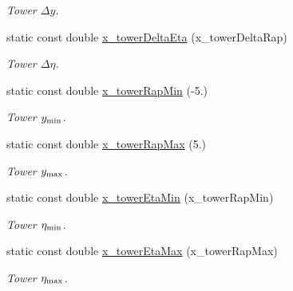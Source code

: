 \begin{CompactItemize}
\begin{CompactList}\small\item\em Tower $\Delta y$. \item\end{CompactList}\item 
\hypertarget{namespaceHistGroupCfg_8cc52200d6669bc50fba32ff5403e3a3}{
static const double \hyperlink{namespaceHistGroupCfg_8cc52200d6669bc50fba32ff5403e3a3}{x\_\-tower\-Delta\-Eta} (x\_\-tower\-Delta\-Rap)}
\label{namespaceHistGroupCfg_8cc52200d6669bc50fba32ff5403e3a3}

\begin{CompactList}\small\item\em Tower $\Delta\eta$. \item\end{CompactList}\item 
\hypertarget{namespaceHistGroupCfg_6cd7abc1eddfd00ceca363394f0793c9}{
static const double \hyperlink{namespaceHistGroupCfg_6cd7abc1eddfd00ceca363394f0793c9}{x\_\-tower\-Rap\-Min} (-5.)}
\label{namespaceHistGroupCfg_6cd7abc1eddfd00ceca363394f0793c9}

\begin{CompactList}\small\item\em Tower $y_{\rm min}$. \item\end{CompactList}\item 
\hypertarget{namespaceHistGroupCfg_dae79e39c9153aa7b5ba9947ff6beb04}{
static const double \hyperlink{namespaceHistGroupCfg_dae79e39c9153aa7b5ba9947ff6beb04}{x\_\-tower\-Rap\-Max} (5.)}
\label{namespaceHistGroupCfg_dae79e39c9153aa7b5ba9947ff6beb04}

\begin{CompactList}\small\item\em Tower $y_{\rm max}$. \item\end{CompactList}\item 
\hypertarget{namespaceHistGroupCfg_29bd5b6734a3c3cb04fd12950562e7a7}{
static const double \hyperlink{namespaceHistGroupCfg_29bd5b6734a3c3cb04fd12950562e7a7}{x\_\-tower\-Eta\-Min} (x\_\-tower\-Rap\-Min)}
\label{namespaceHistGroupCfg_29bd5b6734a3c3cb04fd12950562e7a7}

\begin{CompactList}\small\item\em Tower $\eta_{\rm min}$. \item\end{CompactList}\item 
\hypertarget{namespaceHistGroupCfg_2e7833efae3f89bfd8008c04ae685804}{
static const double \hyperlink{namespaceHistGroupCfg_2e7833efae3f89bfd8008c04ae685804}{x\_\-tower\-Eta\-Max} (x\_\-tower\-Rap\-Max)}
\label{namespaceHistGroupCfg_2e7833efae3f89bfd8008c04ae685804}

\begin{CompactList}\small\item\em Tower $\eta_{\rm max}$. \item\end{CompactList}\end{CompactItemize}
